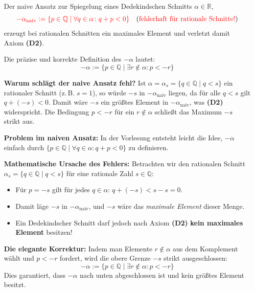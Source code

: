 \begin{math-stroke}
\begin{definition}\label{def:additives-inverses}
Der naive Ansatz zur Spiegelung eines Dedekindschen Schnitts $\alpha \in \mathbb{R}$,
\begin{equation}
\label{eq:additives-inverses-naive}
\textcolor{red}{-\alpha_{\text{naiv}} := \{ p \in \mathbb{Q} \mid \forall q \in \alpha \colon q + p < 0 \}} \quad \text{(\textcolor{red}{fehlerhaft für rationale Schnitte!})}
\end{equation}
erzeugt bei rationalen Schnitten ein maximales Element und verletzt damit Axiom \textbf{(D2)}.

Die präzise und korrekte Definition des  $-\alpha$ lautet:
\begin{equation}
\label{eq:additives-inverses-def}
-\alpha := \{ p \in \mathbb{Q} \mid \exists r \notin \alpha \colon p < -r \}
\end{equation}
\end{definition}

\begin{explanation-of-steps}
\textbf{Warum schlägt der naive Ansatz fehl?} Ist $\alpha = \alpha_s = \{q \in \mathbb{Q} \mid q < s\}$ ein rationaler Schnitt (z.\,B. $s = 1$), so würde $-s$ in $-\alpha_{\text{naiv}}$ liegen, da für alle $q < s$ gilt $q + (-s) < 0$. Damit wäre $-s$ ein größtes Element in $-\alpha_{\text{naiv}}$, was \textbf{(D2)} widerspricht. Die Bedingung $p < -r$ für ein $r \notin \alpha$ schließt das Maximum $-s$ strikt aus.
\end{explanation-of-steps}
\end{math-stroke}

\begin{ai-note}
\textbf{Problem im naiven Ansatz:}
In der Vorlesung entsteht leicht die Idee, $-\alpha$ einfach durch $\{p \in \mathbb{Q} \mid \forall q \in \alpha \colon q + p < 0\}$ zu definieren.

\textbf{Mathematische Ursache des Fehlers:}
Betrachten wir den rationalen Schnitt $\alpha_s = \{q \in \mathbb{Q} \mid q < s\}$ für eine rationale Zahl $s \in \mathbb{Q}$:
\begin{itemize}
    \item Für $p = -s$ gilt für jedes $q \in \alpha$: $q + (-s) < s - s = 0$.
    \item Damit läge $-s$ in $-\alpha_{\text{naiv}}$, und $-s$ wäre das \emph{maximale Element} dieser Menge.
    \item Ein Dedekindscher Schnitt darf jedoch nach Axiom \textbf{(D2)} \textbf{kein maximales Element} besitzen!
\end{itemize}

\textbf{Die elegante Korrektur:}
Indem man Elemente $r \notin \alpha$ aus dem Komplement wählt und $p < -r$ fordert, wird die obere Grenze $-s$ strikt ausgeschlossen:
\[
-\alpha := \{ p \in \mathbb{Q} \mid \exists r \notin \alpha \colon p < -r \}
\]
Dies garantiert, dass $-\alpha$ nach unten abgeschlossen ist und kein größtes Element besitzt.
\end{ai-note}

